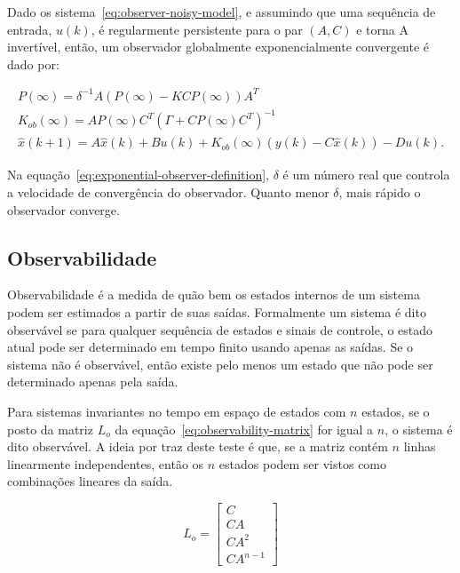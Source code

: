 \begin{theorem}%
	\label{theorem:exponential-observer}
	Dado os sistema~\eqref{eq:observer-noisy-model}, e assumindo que uma
	sequência de entrada, \( u(k) \),  é regularmente persistente para o par \(
	(A,C) \) e torna A invertível, então, um observador globalmente
	exponencialmente convergente é dado por:

	\begin{equation}
		\label{eq:exponential-observer-definition}
		\begin{split}
			P(\infty)=\delta^{-1}A(P(\infty)-KCP(\infty))A^T \\
			K_{ob}(\infty)=AP(\infty)C^T{(\Gamma+CP(\infty)C^T)}^{-1} \\
			\hat{x}(k+1) = A\hat{x}(k) + Bu(k) + K_{ob}(\infty)(y(k) - C\hat{x}(k))-Du(k).
		\end{split}
	\end{equation}
\end{theorem}

Na equação~\eqref{eq:exponential-observer-definition}, \( \delta{} \) é um
número real que controla a velocidade de convergência do observador. Quanto
menor \( \delta{} \), mais rápido o observador converge.

\subsection{Observabilidade}%
\label{subsec:observability}

Observabilidade é a medida de quão bem os estados internos de um sistema podem
ser estimados a partir de suas saídas. Formalmente um sistema é dito observável
se para qualquer sequência de estados e sinais de controle, o estado atual pode
ser determinado em tempo finito usando apenas as saídas. Se o sistema não é
observável, então existe pelo menos um estado que não pode ser determinado
apenas pela saída.

Para sistemas invariantes no tempo em espaço de estados com \( n \) estados, se
o posto da matriz \( L_o \) da equação~\eqref{eq:observability-matrix} for igual
a \( n \), o sistema é dito observável. A ideia por traz deste teste é que, se a
matriz contém \( n \) linhas linearmente independentes, então os \( n \) estados
podem ser vistos como combinações lineares da saída.

\begin{equation}
	\label{eq:observability-matrix}
	L_o = \begin{bmatrix}
		C       \\
		CA      \\
		CA^2    \\
		CA^{n-1}
	\end{bmatrix}
\end{equation}
